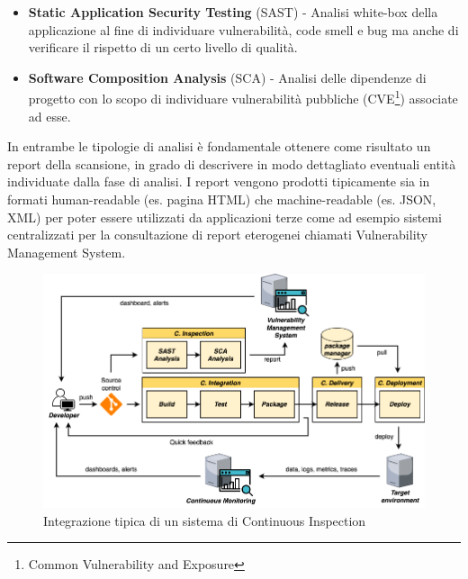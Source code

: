 \begin{itemize}
    \item \textbf{Static Application Security Testing} (SAST) - Analisi white-box della applicazione al fine di individuare vulnerabilità, code smell e bug ma anche di verificare il rispetto di un certo livello di qualità.
    \item \textbf{Software Composition Analysis} (SCA) - Analisi delle dipendenze di progetto con lo scopo di individuare vulnerabilità pubbliche (CVE\footnote{Common Vulnerability and Exposure}) associate ad esse.
\end{itemize}

In entrambe le tipologie di analisi è fondamentale ottenere come risultato un report della scansione, in grado di descrivere in modo dettagliato eventuali entità individuate dalla fase di analisi. I report vengono prodotti tipicamente sia in formati human-readable (es. pagina HTML) che machine-readable (es. JSON, XML) per poter essere utilizzati da applicazioni terze come ad esempio sistemi centralizzati per la consultazione di report eterogenei chiamati Vulnerability Management System.

\begin{figure}[H]
    \centering
    \includegraphics[width=1\textwidth]{img/cinspection-pipeline.png}
    \caption{Integrazione tipica di un sistema di Continuous Inspection}
    \label{ci-inspection-pipeline}
\end{figure}

